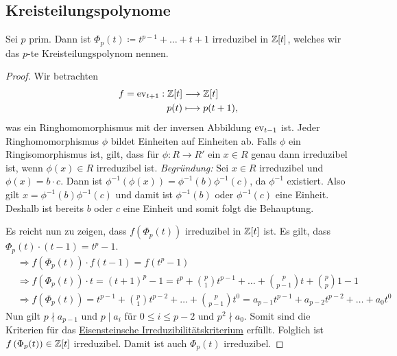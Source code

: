 \documentclass[12pt,a4paper]{scrartcl}
\begin{document}

\subsection{Kreisteilungspolynome}\label{sec:kreisteil}
\begin{anw}
Sei $p$ prim. Dann ist $\Phi_p(t) \coloneqq t^{p-1}+\dots +t+1$ irreduzibel in $\mathbb Z[t]$, welches wir das $p$-te Kreisteilungspolynom nennen.
\end{anw}

\begin{proof}
	Wir betrachten
	\begin{align*}
		f = \operatorname{ev}_{t+1} : \mathbb Z[t] &\longrightarrow \mathbb Z[t] \\
		p(t) &\longmapsto p(t+1) ,
	\end{align*}
	was ein Ringhomomorphismus mit der inversen Abbildung $\operatorname{ev}_{t-1}$ ist. Jeder Ringhomomorphismus $\phi$ bildet Einheiten auf Einheiten ab. Falls $\phi$ ein Ringisomorphismus ist, gilt, dass für $\phi: R \to R'$ ein $x \in R$ genau dann irreduzibel ist, wenn $\phi(x) \in R$ irreduzibel ist.
	\textit{Begründung:} Sei $x \in R$ irreduzibel und $\phi(x) = b\cdot c$. Dann ist $\phi^{-1}\left( \phi (x) \right) = \phi^{-1} (b) \phi^{-1} (c) $, da $\phi^{-1}$ existiert. Also gilt $x = \phi^{-1} (b) \phi^{-1} (c) $ und damit ist $\phi^{-1}(b)$ oder $\phi^{-1}(c)$ eine Einheit. Deshalb ist bereits $b$ oder $c$ eine Einheit und somit folgt die Behauptung.
	
	Es reicht nun zu zeigen, dass $f\left(\Phi_p(t) \right) $ irreduzibel in $\mathbb Z[t]$ ist. Es gilt, dass $\Phi_p(t)\cdot(t-1) = t^p - 1$.
	\begin{align*}
		&\Rightarrow f(\Phi_p(t))\cdot f(t-1) = f(t^p - 1) \\
		&\Rightarrow f(\Phi_p(t)) \cdot t = (t + 1)^p - 1 = t^p + \binom{p}{1}t^{p-1} + \dots + \binom{p}{p-1} t + \binom{p}{p} 1 - 1 \\
		&\Rightarrow f(\Phi_p(t)) = t^{p-1} + \binom{p}{1}t^{p-2} + \dots + \binom{p}{p-1}t^0 = a_{p-1}t^{p-1} + a_{p-2}t^{p-2} + \dots + a_0t^0
	\end{align*}
	Nun gilt $p \nmid a_{p-1}$ und $p \mid a_i$ für $0 \leq i \leq p-2$ und $p^2 \nmid a_0$. Somit sind die Kriterien für das \hyperref[thm:eisenstein]{Eisensteinsche Irreduzibilitätskriterium} erfüllt. Folglich ist $f\left( \Phi_p(t) \right) \in \mathbb Z[t]$ irreduzibel. Damit ist auch $\Phi_p(t)$ irreduzibel.
\end{proof}
\end{document}
